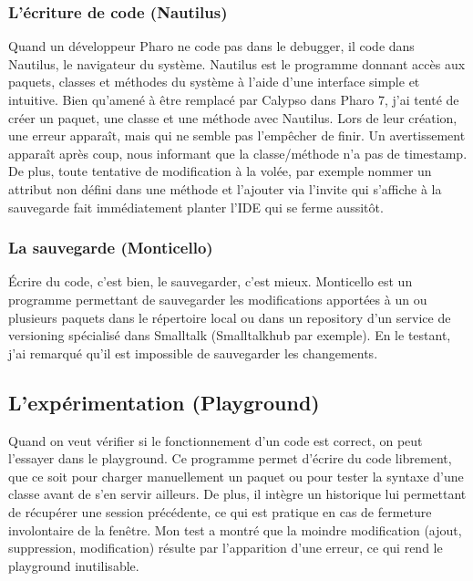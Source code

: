 \subsubsection{L'écriture de code (Nautilus)}
Quand un développeur Pharo ne code pas dans le debugger, il code dans Nautilus, le navigateur du système. Nautilus est le programme donnant accès aux paquets, classes et méthodes du système à l'aide d'une interface simple et intuitive. Bien qu'amené à être remplacé par Calypso dans Pharo 7, j'ai tenté de créer un paquet, une classe et une méthode avec Nautilus. Lors de leur création, une erreur apparaît, mais qui ne semble pas l'empêcher de finir. Un avertissement apparaît après coup, nous informant que la classe/méthode n'a pas de timestamp. De plus, toute tentative de modification à la volée, par exemple nommer un attribut non défini dans une méthode et l'ajouter via l'invite qui s'affiche à la sauvegarde fait immédiatement planter l'IDE qui se ferme aussitôt.

\subsubsection{La sauvegarde (Monticello)}
Écrire du code, c'est bien, le sauvegarder, c'est mieux. Monticello est un programme permettant de sauvegarder les modifications apportées à un ou plusieurs paquets dans le répertoire local ou dans un repository d'un service de versioning spécialisé dans Smalltalk (Smalltalkhub par exemple). En le testant, j'ai remarqué qu'il est impossible de sauvegarder les changements.

\subsection{L'expérimentation (Playground)}
Quand on veut vérifier si le fonctionnement d'un code est correct, on peut l'essayer dans le playground. Ce programme permet d'écrire du code librement, que ce soit pour charger manuellement un paquet ou pour tester la syntaxe d'une classe avant de s'en servir ailleurs. De plus, il intègre un historique lui permettant de récupérer une session précédente, ce qui est pratique en cas de fermeture involontaire de la fenêtre. Mon test a montré que la moindre modification (ajout, suppression, modification) résulte par l'apparition d'une erreur, ce qui rend le playground inutilisable.